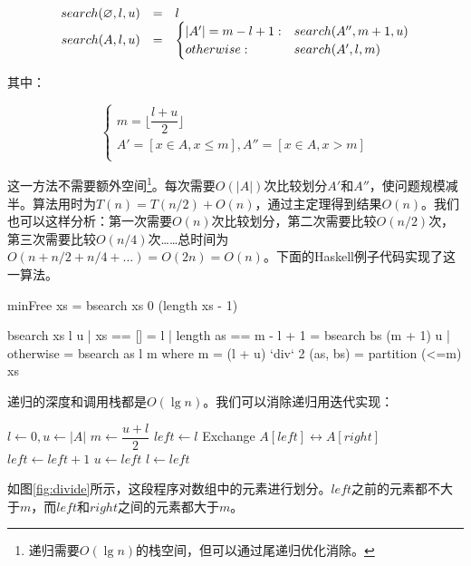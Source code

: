 \documentclass[b5paper]{ctexart}
\begin{document}
\[
\begin{array}{rcl}
search(\varnothing, l, u) & = & l \\
search(A, l, u) & = & \begin{cases}
       |A'| = m - l + 1 : & search(A'', m+1, u) \\
       otherwise : & search(A',  l, m) \\
\end{cases}
\end{array}
\]

其中：

\[
\begin{cases}
m = \lfloor \dfrac{l + u}{2} \rfloor \\
A' = [x \in A, x \leq m ], A'' = [x \in A, x > m ] \\
\end{cases}
\]

这一方法不需要额外空间\footnote{递归需要$O(\lg n)$的栈空间，但可以通过尾递归优化消除。}。每次需要$O(|A|)$次比较划分$A'$和$A''$，使问题规模减半。算法用时为$T(n) = T(n/2) + O(n)$，通过主定理得到结果$O(n)$。我们也可以这样分析：第一次需要$O(n)$次比较划分，第二次需要比较$O(n/2)$次，第三次需要比较$O(n/4)$次……总时间为$O(n + n/2 + n/4 + ...) = O(2n) = O(n)$。下面的Haskell例子代码实现了这一算法。

\lstset{frame = single}
\begin{Haskell}
minFree xs = bsearch xs 0 (length xs - 1)

bsearch xs l u | xs == [] = l
               | length as == m - l + 1 = bsearch bs (m + 1) u
               | otherwise = bsearch as l m
    where
      m = (l + u) `div` 2
      (as, bs) = partition (<=m) xs
\end{Haskell}

递归的深度和调用栈都是$O(\lg n)$。我们可以消除递归用迭代实现：

\begin{algorithmic}[1]
  \State $l \gets 0, u \gets |A|$
    \State $m \gets \dfrac{u + l}{2}$
    \State $left \gets l$
        \State Exchange $A[left] \leftrightarrow A[right]$
        \State $left \gets left + 1$
      \EndIf
    \EndFor
      \State $u \gets left$
    \Else
      \State $l \gets left$
    \EndIf
  \EndWhile
\EndFunction
\end{algorithmic}

如图\ref{fig:divide}所示，这段程序对数组中的元素进行划分。$left$之前的元素都不大于$m$，而$left$和$right$之间的元素都大于$m$。
\end{document}
